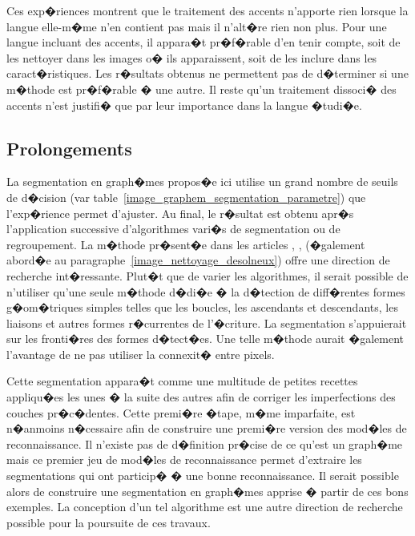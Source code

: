 Ces exp�riences montrent que le traitement des accents n'apporte rien lorsque la langue elle-m�me n'en contient pas mais il n'alt�re rien non plus. Pour une langue incluant des accents, il appara�t pr�f�rable d'en tenir compte, soit de les nettoyer dans les images o� ils apparaissent, soit de les inclure dans les caract�ristiques. Les r�sultats obtenus ne permettent pas de d�terminer si une m�thode est pr�f�rable � une autre. Il reste qu'un traitement dissoci� des accents n'est justifi� que par leur importance dans la langue �tudi�e.










\subsection{Prolongements}
\label{image_prolongement_segmentation_grapheme}

La segmentation en graph�mes propos�e ici utilise un grand nombre de seuils de d�cision (var table~\ref{image_graphem_segmentation_parametre}) que l'exp�rience permet d'ajuster. Au final, le r�sultat est obtenu apr�s l'application successive d'algorithmes vari�s de segmentation ou de regroupement. La m�thode pr�sent�e dans les articles , ,  (�galement abord�e au paragraphe~\ref{image_nettoyage_desolneux}) offre une direction de recherche int�ressante. Plut�t que de varier les algorithmes, il serait possible de n'utiliser qu'une seule m�thode d�di�e � la d�tection de diff�rentes formes g�om�triques simples telles que les boucles, les ascendants et descendants, les liaisons et autres formes r�currentes de l'�criture. La segmentation s'appuierait sur les fronti�res des formes d�tect�es. Une telle m�thode aurait �galement l'avantage de ne pas utiliser la connexit� entre pixels.


Cette segmentation appara�t comme une multitude de petites recettes appliqu�es les unes � la suite des autres afin de corriger les imperfections des couches pr�c�dentes. Cette premi�re �tape, m�me imparfaite, est n�anmoins n�cessaire afin de construire une premi�re version des mod�les de reconnaissance. Il n'existe pas de d�finition pr�cise de ce qu'est un graph�me mais ce premier jeu de mod�les de reconnaissance permet d'extraire les segmentations qui ont particip� � une bonne reconnaissance. Il serait possible alors de construire une segmentation en graph�mes apprise � partir de ces bons exemples. La conception d'un tel algorithme est une autre direction de recherche possible pour la poursuite de ces travaux.

